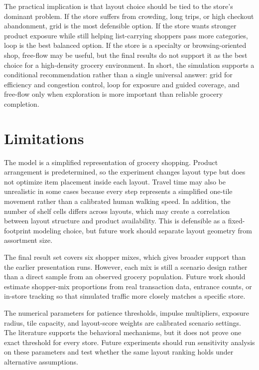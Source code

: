 \documentclass[sigconf,nonacm]{acmart}
\begin{document}
The practical implication is that layout choice should be tied to the store's dominant problem. If the store suffers from crowding, long trips, or high checkout abandonment, grid is the most defensible option. If the store wants stronger product exposure while still helping list-carrying shoppers pass more categories, loop is the best balanced option. If the store is a specialty or browsing-oriented shop, free-flow may be useful, but the final results do not support it as the best choice for a high-density grocery environment. In short, the simulation supports a conditional recommendation rather than a single universal answer: grid for efficiency and congestion control, loop for exposure and guided coverage, and free-flow only when exploration is more important than reliable grocery completion.

\section{Limitations}

The model is a simplified representation of grocery shopping. Product arrangement is predetermined, so the experiment changes layout type but does not optimize item placement inside each layout. Travel time may also be unrealistic in some cases because every step represents a simplified one-tile movement rather than a calibrated human walking speed. In addition, the number of shelf cells differs across layouts, which may create a correlation between layout structure and product availability. This is defensible as a fixed-footprint modeling choice, but future work should separate layout geometry from assortment size.

The final result set covers six shopper mixes, which gives broader support than the earlier presentation runs. However, each mix is still a scenario design rather than a direct sample from an observed grocery population. Future work should estimate shopper-mix proportions from real transaction data, entrance counts, or in-store tracking so that simulated traffic more closely matches a specific store.

The numerical parameters for patience thresholds, impulse multipliers, exposure radius, tile capacity, and layout-score weights are calibrated scenario settings. The literature supports the behavioral mechanisms, but it does not prove one exact threshold for every store. Future experiments should run sensitivity analysis on these parameters and test whether the same layout ranking holds under alternative assumptions.
\end{document}
